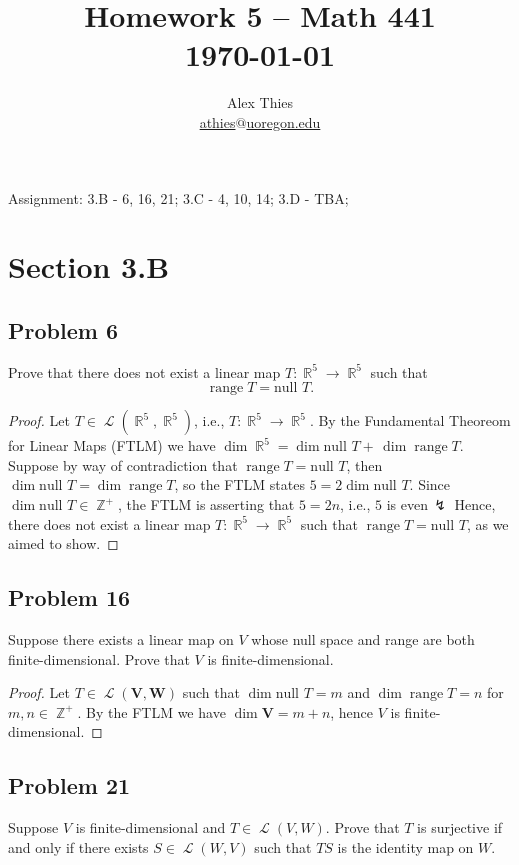 \documentclass[letterpaper, 12pt]{amsart}
\DeclareMathOperator{\Z}{\mathbb{Z}}
\DeclareMathOperator{\R}{\mathbb{R}}
\renewcommand{\null}{\text{null }}
\DeclareMathOperator{\range}{\text{range }}
\DeclareMathOperator{\Ell}{\mathscr{L}}
\theoremstyle{definition}  %
\begin{document}
	\title{Homework 5  -- Math 441 \\ \today}
	\author{Alex Thies \\ \href{mailto:athies@uoregon.edu}{\lowercase{athies$@$uoregon.edu}}}

	\maketitle

	Assignment: 3.B - 6, 16, 21; 3.C - 4, 10, 14; 3.D - TBA;

	\section*{Section 3.B}
		\subsection*{Problem 6}
		Prove that there does not exist a linear map $T : \R^{5} \to \R^{5}$ such that $$\range T = \null T.$$

		\begin{proof}
		Let $T \in \Ell(\R^{5}, \R^{5})$, i.e., $T : \R^{5} \to \R^{5}$.
		By the Fundamental Theoreom for Linear Maps (FTLM) we have $\dim \R^{5} = \dim \null T + \, \dim \range T$.
		Suppose by way of contradiction that $\range T = \null T$, then $\dim \null T = \dim \range T$, so the FTLM states $5 = 2 \dim \null T$.
		Since $\dim \null T \in \Z^{+}$, the FTLM is asserting that $5 = 2n$, i.e., $5$ is even$\, \lightning$		
		Hence, there does not exist a linear map $T : \R^{5} \to \R^{5}$ such that $\range T = \null T$, as we aimed to show.
		\end{proof}

		\subsection*{Problem 16}
		Suppose there exists a linear map on $V$ whose null space and range are both finite-dimensional. 
		Prove that $V$ is finite-dimensional.

		\begin{proof}
		Let $T \in \Ell(\mathbf{V},\mathbf{W})$ such that $\dim \null T = m$ and $\dim \range T = n$ for $m,n \in \Z^{+}$.
		By the FTLM we have $\dim \mathbf{V} = m + n$, hence $V$ is finite-dimensional.
		\end{proof}

		\subsection*{Problem 21}
		Suppose $V$ is finite-dimensional and $T \in \Ell(V,W)$. 
		Prove that $T$ is surjective if and only if there exists $S \in \Ell(W,V)$ such that $TS$ is the identity map on $W$.
\end{document}
